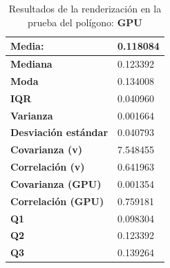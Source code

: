 \begin{table}[htp]
\centering


    
    \begin{center}
    \begin{tabular}{ | l | l | }
        
        
        \hline
        \textbf{Media: }  & 0.118084 \\
        \hline
        \textbf{Mediana} & 0.123392 \\
        \hline
        \textbf{Moda} & 0.134008 \\
        \hline
        \textbf{IQR} & 0.040960 \\
        \hline
        \textbf{Varianza} & 0.001664 \\
        \hline
        \textbf{Desviación estándar} & 0.040793 \\
        \hline
        \textbf{Covarianza (v)} & 7.548455 \\
        \hline
        \textbf{Correlación (v)} & 0.641963 \\
        \hline
        \textbf{Covarianza (GPU)} & 0.001354 \\
        \hline
        \textbf{Correlación (GPU)} & 0.759181 \\
        \hline
        \textbf{Q1} & 0.098304 \\
        \hline
        \textbf{Q2} & 0.123392 \\
        \hline
        \textbf{Q3} & 0.139264 \\
        \hline
        
    \end{tabular} 
    \end{center}
    
    \caption{Resultados de la renderización en la prueba del polígono: \textbf{GPU}}
    
    \label{tbl:results-polygon-render-gpu}
\end{table}